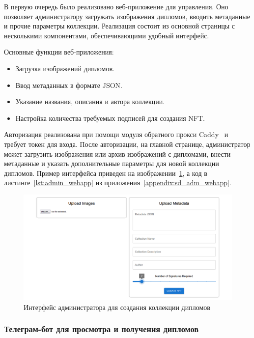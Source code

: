 В первую очередь было реализовано веб-приложение для управления. Оно позволяет администратору загружать изображения дипломов, вводить метаданные и прочие параметры коллекции. Реализация состоит из основной страницы с несколькими компонентами, обеспечивающими удобный интерфейс.

Основные функции веб-приложения:
\begin{itemize}
    \item Загрузка изображений дипломов.
    \item Ввод метаданных в формате JSON.
    \item Указание названия, описания и автора коллекции.
    \item Настройка количества требуемых подписей для создания NFT.
\end{itemize}

Авторизация реализована при помощи модуля обратного прокси Caddy~\cite{bib:caddy} и требует токен для входа. После авторизации, на главной странице, администратор может загрузить изображения или архив изображений с дипломами, внести метаданные и указать дополнительные параметры для новой коллекции дипломов. Пример интерфейса приведен на изображении~\ref{fig:s3_admin_webapp}, а код в листинге~\ref{lst:admin_webapp} из приложения~\ref{appendix:sd_adm_webapp}.

\begin{figure}[H]
	\centering
	\includegraphics[width=1\textwidth]{images/s3_admin_webapp.png}
	\parskip=6pt
	\caption{Интерфейс администратора для создания коллекции дипломов}
	\label{fig:s3_admin_webapp}
\end{figure}

\subsubsection{Телеграм-бот для просмотра и получения дипломов}

